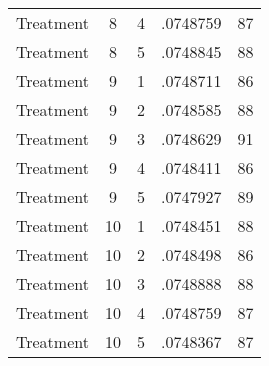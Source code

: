 \begin{tabular}{l*{4}{c}}
Treatment           &           8&           4&    .0748759&          87\\
Treatment           &           8&           5&    .0748845&          88\\
Treatment           &           9&           1&    .0748711&          86\\
Treatment           &           9&           2&    .0748585&          88\\
Treatment           &           9&           3&    .0748629&          91\\
Treatment           &           9&           4&    .0748411&          86\\
Treatment           &           9&           5&    .0747927&          89\\
Treatment           &          10&           1&    .0748451&          88\\
Treatment           &          10&           2&    .0748498&          86\\
Treatment           &          10&           3&    .0748888&          88\\
Treatment           &          10&           4&    .0748759&          87\\
Treatment           &          10&           5&    .0748367&          87\\
\hline\hline
\end{tabular}
